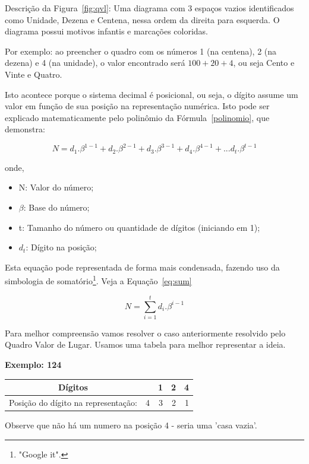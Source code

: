 Descrição da Figura~\ref{fig:qvl}: Uma diagrama com 3 espaços vazios identificados como Unidade, Dezena e Centena, nessa ordem da direita para esquerda. O diagrama possui motivos infantis e marcações coloridas.

Por exemplo: ao preencher o quadro com os números 1 (na centena), 2 (na dezena) e 4 (na unidade), o valor encontrado será \(100 + 20 + 4\), ou seja Cento e Vinte e Quatro.

Isto acontece porque o sistema decimal é posicional, ou seja, o dígito assume um valor em função de sua posição na representação numérica. Isto pode ser explicado matematicamente pelo polinômio da Fórmula~\ref{polinomio}, que demonstra:

\begin{equation}\label{polinomio}
N=d_1.\beta^{1-1}+d_2.\beta^{2-1}+d_3.\beta^{3-1}+d_4.\beta^{4-1}+...d_t.\beta^{t-1}
\end{equation}

onde,
\begin{itemize}
	\item N: Valor do número;
	\item $\beta$: Base do número;
	\item t: Tamanho do número ou quantidade de dígitos (iniciando em 1);
	\item $d_t$: Dígito na posição;
\end{itemize}

Esta equação pode representada de forma mais condensada, fazendo uso da simbologia de somatório\footnote{"Google it".}. Veja a Equação~\ref{eq:sum}

\begin{equation}\label{eq:sum}
N=\sum_{i=1}^{t}d_i.\beta^{i-1}
\end{equation}

Para melhor compreensão vamos resolver o caso anteriormente resolvido pelo Quadro Valor de Lugar. Usamos uma tabela para melhor representar a ideia.

\noindent\textbf{Exemplo: 124}
\begin{table}[h]
	\centering
	\begin{tabular}{|c|r|r|r|r|}
		\hline
		Dígitos 	&  & 1 & 2 & 4  \\
		\hline
		Posição do dígito na representação:	& 4 & 3 & 2 & 1  \\
		\hline
	\end{tabular}
\end{table}

Observe que não há um numero na posição 4 - seria uma 'casa vazia'.

